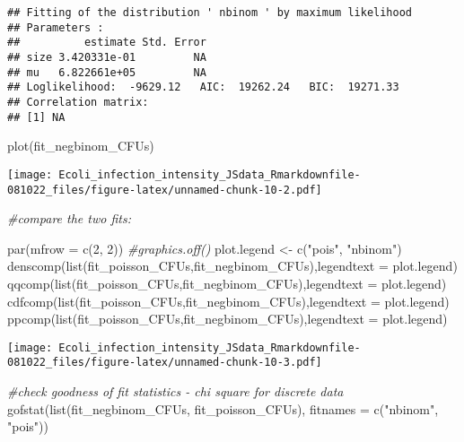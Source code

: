 \documentclass[
]{article}
\newenvironment{Shaded}{\begin{snugshade}}{\end{snugshade}}
\newcommand{\AttributeTok}[1]{\textcolor[rgb]{0.77,0.63,0.00}{#1}}
\newcommand{\CommentTok}[1]{\textcolor[rgb]{0.56,0.35,0.01}{\textit{#1}}}
\newcommand{\DecValTok}[1]{\textcolor[rgb]{0.00,0.00,0.81}{#1}}
\newcommand{\FunctionTok}[1]{\textcolor[rgb]{0.00,0.00,0.00}{#1}}
\newcommand{\NormalTok}[1]{#1}
\newcommand{\OtherTok}[1]{\textcolor[rgb]{0.56,0.35,0.01}{#1}}
\newcommand{\StringTok}[1]{\textcolor[rgb]{0.31,0.60,0.02}{#1}}
\begin{document}
\begin{verbatim}
## Fitting of the distribution ' nbinom ' by maximum likelihood 
## Parameters : 
##          estimate Std. Error
## size 3.420331e-01         NA
## mu   6.822661e+05         NA
## Loglikelihood:  -9629.12   AIC:  19262.24   BIC:  19271.33 
## Correlation matrix:
## [1] NA
\end{verbatim}

\begin{Shaded}
\begin{Highlighting}[]
\FunctionTok{plot}\NormalTok{(fit\_negbinom\_CFUs)}
\end{Highlighting}
\end{Shaded}

\texttt{[image: Ecoli\_infection\_intensity\_JSdata\_Rmarkdownfile-081022\_files/figure-latex/unnamed-chunk-10-2.pdf]}

\begin{Shaded}
\begin{Highlighting}[]
\CommentTok{\#compare the two fits:}

\FunctionTok{par}\NormalTok{(}\AttributeTok{mfrow =} \FunctionTok{c}\NormalTok{(}\DecValTok{2}\NormalTok{, }\DecValTok{2}\NormalTok{))}
\CommentTok{\#graphics.off()}
\NormalTok{plot.legend }\OtherTok{\textless{}{-}} \FunctionTok{c}\NormalTok{(}\StringTok{"pois"}\NormalTok{, }\StringTok{"nbinom"}\NormalTok{)}
\FunctionTok{denscomp}\NormalTok{(}\FunctionTok{list}\NormalTok{(fit\_poisson\_CFUs,fit\_negbinom\_CFUs),}\AttributeTok{legendtext =}\NormalTok{ plot.legend)}
\FunctionTok{qqcomp}\NormalTok{(}\FunctionTok{list}\NormalTok{(fit\_poisson\_CFUs,fit\_negbinom\_CFUs),}\AttributeTok{legendtext =}\NormalTok{ plot.legend)}
\FunctionTok{cdfcomp}\NormalTok{(}\FunctionTok{list}\NormalTok{(fit\_poisson\_CFUs,fit\_negbinom\_CFUs),}\AttributeTok{legendtext =}\NormalTok{ plot.legend)}
\FunctionTok{ppcomp}\NormalTok{(}\FunctionTok{list}\NormalTok{(fit\_poisson\_CFUs,fit\_negbinom\_CFUs),}\AttributeTok{legendtext =}\NormalTok{ plot.legend)}
\end{Highlighting}
\end{Shaded}

\texttt{[image: Ecoli\_infection\_intensity\_JSdata\_Rmarkdownfile-081022\_files/figure-latex/unnamed-chunk-10-3.pdf]}

\begin{Shaded}
\begin{Highlighting}[]
\CommentTok{\#check goodness of fit statistics {-} chi square for discrete data}
\FunctionTok{gofstat}\NormalTok{(}\FunctionTok{list}\NormalTok{(fit\_negbinom\_CFUs, fit\_poisson\_CFUs),}
        \AttributeTok{fitnames =} \FunctionTok{c}\NormalTok{(}\StringTok{"nbinom"}\NormalTok{, }\StringTok{"pois"}\NormalTok{))}
\end{Highlighting}
\end{Shaded}
\end{document}
